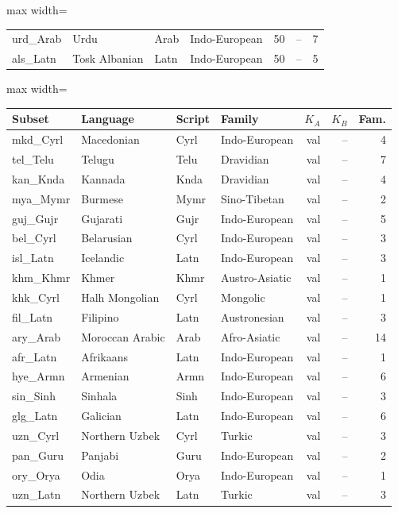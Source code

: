 \begin{table}[p]
\begin{minipage}[t]{0.49\textwidth}
\begin{adjustbox}{max width=\linewidth}
\begin{tabular}[t]{llllrrr}
urd\_Arab & Urdu & Arab & Indo-European & 50 & -- & 7 \\
als\_Latn & Tosk Albanian & Latn & Indo-European & 50 & -- & 5 \\
\bottomrule
\end{tabular}
\end{adjustbox}
\end{minipage}\hfill
\begin{minipage}[t]{0.49\textwidth}\centering
\begin{adjustbox}{max width=\linewidth}
\begin{tabular}[t]{llllrrr}
\toprule
Subset & Language & Script & Family & $K_A$ & $K_B$ & Fam. \\
\midrule
mkd\_Cyrl & Macedonian & Cyrl & Indo-European & val & -- & 4 \\
tel\_Telu & Telugu & Telu & Dravidian & val & -- & 7 \\
kan\_Knda & Kannada & Knda & Dravidian & val & -- & 4 \\
mya\_Mymr & Burmese & Mymr & Sino-Tibetan & val & -- & 2 \\
guj\_Gujr & Gujarati & Gujr & Indo-European & val & -- & 5 \\
bel\_Cyrl & Belarusian & Cyrl & Indo-European & val & -- & 3 \\
isl\_Latn & Icelandic & Latn & Indo-European & val & -- & 3 \\
khm\_Khmr & Khmer & Khmr & Austro-Asiatic & val & -- & 1 \\
khk\_Cyrl & Halh Mongolian & Cyrl & Mongolic & val & -- & 1 \\
fil\_Latn & Filipino & Latn & Austronesian & val & -- & 3 \\
ary\_Arab & Moroccan Arabic & Arab & Afro-Asiatic & val & -- & 14 \\
afr\_Latn & Afrikaans & Latn & Indo-European & val & -- & 1 \\
hye\_Armn & Armenian & Armn & Indo-European & val & -- & 6 \\
sin\_Sinh & Sinhala & Sinh & Indo-European & val & -- & 3 \\
glg\_Latn & Galician & Latn & Indo-European & val & -- & 6 \\
uzn\_Cyrl & Northern Uzbek & Cyrl & Turkic & val & -- & 3 \\
pan\_Guru & Panjabi & Guru & Indo-European & val & -- & 2 \\
ory\_Orya & Odia & Orya & Indo-European & val & -- & 1 \\
uzn\_Latn & Northern Uzbek & Latn & Turkic & val & -- & 3 \\

\end{tabular}
\end{adjustbox}
\end{minipage}
\end{table}
